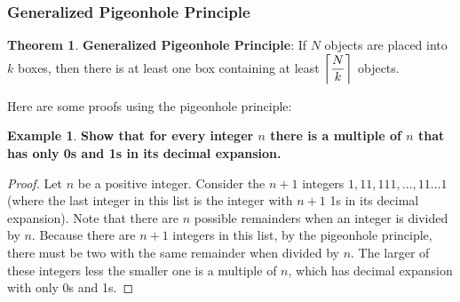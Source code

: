 \documentclass[article, 11pt]{article}
\theoremstyle{definition}
\newtheorem{example}{Example}[subsubsection]
\newtheorem{theorem}{Theorem}[subsubsection]
\DeclarePairedDelimiter\ceil{\lceil}{\rceil} %
\newcommand{\df}{\displaystyle\frac} %
\begin{document}
    \subsubsection{Generalized Pigeonhole Principle}
    \begin{theorem}
        \textbf{Generalized Pigeonhole Principle}: If $N$ objects are placed into $k$ boxes, then there is at least one box containing at least $\ceil*{\df{N}{k}}$ objects.
    \end{theorem}
    Here are some proofs using the pigeonhole principle:
    \begin{example}
        \textbf{Show that for every integer $n$ there is a multiple of $n$ that has only 0s and 1s in its decimal expansion.}
        \begin{proof}
            Let $n$ be a positive integer. Consider the $n+1$ integers $1,11,111,\dots,11\dots 1$ (where the last integer in this list is the integer with $n+1$ 1s in its decimal expansion). Note that there are $n$ possible remainders when an integer is divided by $n$. Because there are $n+1$ integers in this list, by the pigeonhole principle, there must be two with the same remainder when divided by $n$. The larger of these integers less the smaller one is a multiple of $n$, which has decimal expansion with only 0s and 1s.
        \end{proof}
    \end{example}
\end{document}
